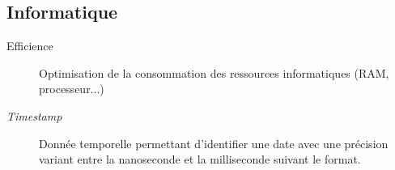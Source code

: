 \subsection{Informatique}

\begin{description}
  \item[Efficience] Optimisation de la consommation des ressources informatiques (RAM, processeur...) 
  \item[\textit{Timestamp}] Donnée temporelle permettant d'identifier une date avec une précision variant entre la nanoseconde et la milliseconde suivant le format.
\end{description}


    
